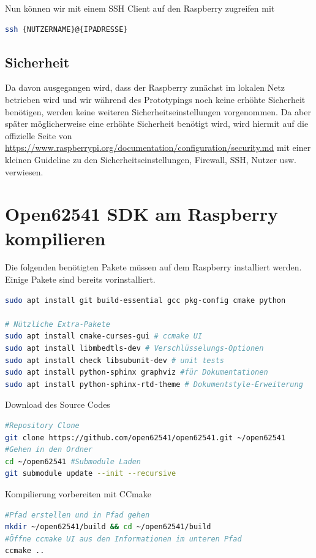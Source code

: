 Nun können wir mit einem SSH Client auf den Raspberry zugreifen mit
\begin{lstlisting}[language=Bash]
 ssh {NUTZERNAME}@{IPADRESSE}
\end{lstlisting}
\subsection{Sicherheit}
Da davon ausgegangen wird, dass der Raspberry zunächst im lokalen Netz betrieben wird und wir während des Prototypings noch keine erhöhte Sicherheit benötigen, werden keine weiteren Sicherheitseinstellungen vorgenommen. Da aber später möglicherweise eine erhöhte Sicherheit benötigt wird, wird hiermit auf die offizielle Seite von \url{https://www.raspberrypi.org/documentation/configuration/security.md} mit einer kleinen Guideline zu den Sicherheitseinstellungen, Firewall, SSH, Nutzer usw. verwiesen.
\clearpage
\section{Open62541 SDK am Raspberry kompilieren}\label{sec:open62541}
Die folgenden benötigten Pakete müssen auf dem Raspberry installiert werden. Einige Pakete sind bereits vorinstalliert.

\begin{lstlisting}[language=Bash]
sudo apt install git build-essential gcc pkg-config cmake python

# Nützliche Extra-Pakete
sudo apt install cmake-curses-gui # ccmake UI
sudo apt install libmbedtls-dev # Verschlüsselungs-Optionen
sudo apt install check libsubunit-dev # unit tests
sudo apt install python-sphinx graphviz #für Dokumentationen
sudo apt install python-sphinx-rtd-theme # Dokumentstyle-Erweiterung
\end{lstlisting}

Download des Source Codes
\begin{lstlisting}[language=Bash]
#Repository Clone
git clone https://github.com/open62541/open62541.git ~/open62541
#Gehen in den Ordner
cd ~/open62541 #Submodule Laden
git submodule update --init --recursive
\end{lstlisting}

Kompilierung vorbereiten mit CCmake
\begin{lstlisting}[language=Bash]
#Pfad erstellen und in Pfad gehen
mkdir ~/open62541/build && cd ~/open62541/build
#Öffne ccmake UI aus den Informationen im unteren Pfad
ccmake ..
\end{lstlisting}

